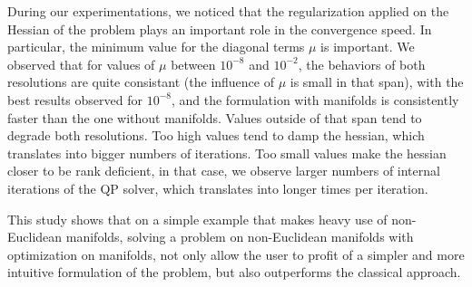 During our experimentations, we noticed that the regularization applied on the Hessian of the problem plays an important role in the convergence speed.
In particular, the minimum value for the diagonal terms $\mu$ is important.
We observed that for values of $\mu$ between $10^{-8}$ and $10^{-2}$, the behaviors of both resolutions are quite consistant (the influence of $\mu$ is small in that span), with the best results observed for $10^{-8}$, and the formulation with manifolds is consistently faster than the one without manifolds.
Values outside of that span tend to degrade both resolutions.
Too high values tend to damp the hessian, which translates into bigger numbers of iterations.
Too small values make the hessian closer to be rank deficient, in that case, we observe larger numbers of internal iterations of the QP solver, which translates into longer times per iteration.

This study shows that on a simple example that makes heavy use of non-Euclidean manifolds, solving a problem on non-Euclidean manifolds with optimization on manifolds, not only allow the user to profit of a simpler and more intuitive formulation of the problem, but also outperforms the classical approach.
